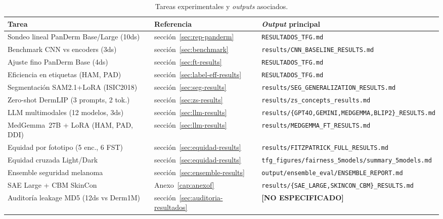 \begin{table}[H]
\centering
\footnotesize
\setlength{\tabcolsep}{3pt}
\renewcommand{\arraystretch}{0.95}
\caption{Tareas experimentales y \emph{outputs} asociados.}
\label{tab:anexoa-tareas}
\begin{tabular}{lll}
\hline
Tarea                                   & Referencia      & \emph{Output} principal \\
\hline
Sondeo lineal PanDerm Base/Large (10ds) & secci\'on~\ref{sec:rep-panderm}     & \texttt{RESULTADOS\_TFG.md} \\
Benchmark CNN vs encoders (3ds)         & secci\'on~\ref{sec:benchmark}       & \texttt{results/CNN\_BASELINE\_RESULTS.md} \\
Ajuste fino PanDerm Base (4ds)          & secci\'on~\ref{sec:ft-results}      & \texttt{RESULTADOS\_TFG.md} \\
Eficiencia en etiquetas (HAM, PAD)      & secci\'on~\ref{sec:label-eff-results}& \texttt{RESULTADOS\_TFG.md} \\
Segmentación SAM2.1+LoRA (ISIC2018)     & secci\'on~\ref{sec:seg-results}     & \texttt{results/SEG\_GENERALIZATION\_RESULTS.md} \\
Zero-shot DermLIP (3 prompts, 2 tok.)   & secci\'on~\ref{sec:zs-results}      & \texttt{results/zs\_concepts\_results.md} \\
LLM multimodales (12 modelos, 3ds)      & secci\'on~\ref{sec:llm-results}     & \texttt{results/\{GPT4O,GEMINI,MEDGEMMA,BLIP2\}\_RESULTS.md} \\
MedGemma~27B + LoRA (HAM, PAD, DDI)     & secci\'on~\ref{sec:llm-results}     & \texttt{results/MEDGEMMA\_FT\_RESULTS.md} \\
Equidad por fototipo (5 enc., 6 FST)    & secci\'on~\ref{sec:equidad-results} & \texttt{results/FITZPATRICK\_FULL\_RESULTS.md} \\
Equidad cruzada Light/Dark              & secci\'on~\ref{sec:equidad-results} & \texttt{tfg\_figures/fairness\_5models/summary\_5models.md} \\
Ensemble seguridad melanoma             & secci\'on~\ref{sec:ensemble-results}& \texttt{output/ensemble\_eval/ENSEMBLE\_REPORT.md} \\
SAE Large + CBM SkinCon                 & Anexo~\ref{cap:anexof}      & \texttt{results/\{SAE\_LARGE,SKINCON\_CBM\}\_RESULTS.md} \\
Auditoría leakage MD5 (12ds vs Derm1M)  & secci\'on~\ref{sec:auditoria-resultados} & \textbf{[NO ESPECIFICADO]} \\
\hline
\end{tabular}
\end{table}

